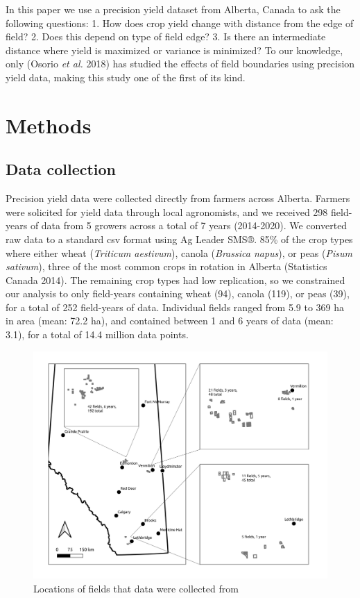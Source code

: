 \documentclass[]{elsarticle} %
\begin{document}
In this paper we use a precision yield dataset from Alberta, Canada to ask the following questions:
1. How does crop yield change with distance from the edge of field?
2. Does this depend on type of field edge?
3. Is there an intermediate distance where yield is maximized or variance is minimized?
To our knowledge, only (Osorio \emph{et al.} 2018) has studied the effects of field boundaries using precision yield data, making this study one of the first of its kind.

\hypertarget{methods}{%
\section{Methods}\label{methods}}

\hypertarget{data-collection}{%
\subsection{Data collection}\label{data-collection}}

Precision yield data were collected directly from farmers across Alberta.
Farmers were solicited for yield data through local agronomists, and we received 298 field-years of data from 5 growers across a total of 7 years (2014-2020).
We converted raw data to a standard csv format using Ag Leader SMS®.
85\% of the crop types where either wheat (\emph{Triticum aestivum}), canola (\emph{Brassica napus}), or peas (\emph{Pisum sativum}), three of the most common crops in rotation in Alberta (Statistics Canada 2014).
The remaining crop types had low replication, so we constrained our analysis to only field-years containing wheat (94), canola (119), or peas (39), for a total of 252 field-years of data.
Individual fields ranged from 5.9 to 369 ha in area (mean: 72.2 ha), and contained between 1 and 6 years of data (mean: 3.1), for a total of 14.4 million data points.

\begin{figure}
\includegraphics[width=1\linewidth]{../Figures/Field Locations} \caption{Locations of fields that data were collected from}\label{fig:fieldLocataions}
\end{figure}
\end{document}
